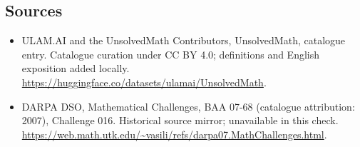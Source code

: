 \documentclass[11pt]{article}
\begin{document}
\subsection{Sources}
\begin{itemize}
\item[\hypertarget{source:statement:1}{S1}] ULAM.AI and the UnsolvedMath Contributors, UnsolvedMath, catalogue entry. Catalogue curation under CC BY 4.0; definitions and English exposition added locally.
\url{https://huggingface.co/datasets/ulamai/UnsolvedMath}.
\item[\hypertarget{source:statement:2}{S2}] DARPA DSO, Mathematical Challenges, BAA 07-68 (catalogue attribution: 2007), Challenge 016. Historical source mirror; unavailable in this check.
\url{https://web.math.utk.edu/~vasili/refs/darpa07.MathChallenges.html}.
\end{itemize}
\label{end:statement}
\end{document}
